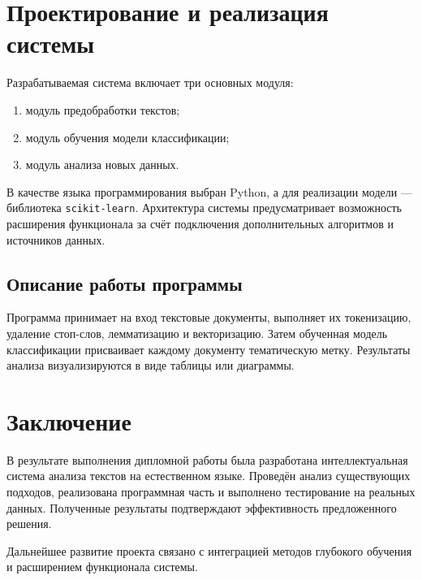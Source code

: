 \documentclass[14pt,a4paper]{extarticle}
\begin{document}
\newpage
\section{Проектирование и реализация системы}
Разрабатываемая система включает три основных модуля:
\begin{enumerate}
    \item модуль предобработки текстов;
    \item модуль обучения модели классификации;
    \item модуль анализа новых данных.
\end{enumerate}

В качестве языка программирования выбран Python, а для реализации модели — библиотека \texttt{scikit-learn}.
Архитектура
системы предусматривает возможность расширения функционала за счёт подключения дополнительных алгоритмов и источников данных.

\subsection{Описание работы программы}
Программа принимает на вход текстовые документы, выполняет их токенизацию, удаление стоп-слов, лемматизацию и векторизацию.
Затем обученная модель классификации присваивает каждому документу тематическую метку.
Результаты анализа визуализируются в виде таблицы или диаграммы.

\newpage
\section*{Заключение}
В результате выполнения дипломной работы была разработана интеллектуальная система анализа текстов на естественном языке.
Проведён анализ существующих подходов, реализована программная часть и выполнено тестирование на реальных данных.
Полученные результаты подтверждают эффективность предложенного решения.

Дальнейшее развитие проекта связано с интеграцией методов глубокого обучения и расширением функционала системы.
\end{document}
